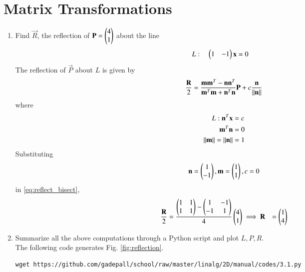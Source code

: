 \documentclass[journal,12pt,twocolumn]{IEEEtran}
\renewcommand\thesection{\arabic{section}}
\begin{document}
\section{Matrix Transformations}
\begin{enumerate}[label=\thesection.\arabic*
,ref=\thesection.\theenumi]

\item Find $\vec{R}$, the reflection  of $\mathbf{P}=\begin{pmatrix}4 \\ 1\end{pmatrix}$ about the line
\begin{align}
L: \quad \begin{pmatrix}1 & -1\end{pmatrix}\mathbf{x} &= 0
\end{align}
\solution The reflection of $\vec{P}$ about  $L$ is given by
\begin{align}
\label{eq:reflect_bisect}
\frac{\mathbf{R}}{2} = \frac{\mathbf{m}\mathbf{m}^T-\mathbf{n}\mathbf{n}^T}{\mathbf{m}^T\mathbf{m}+\mathbf{n}^T\mathbf{n}}\mathbf{P} + c 
\frac{\mathbf{n}}{\lVert\mathbf{n}\rVert}
\end{align}
%
where 
\begin{align}
L: \mathbf{n}^T\mathbf{x} &= c
\\
\mathbf{m}^T\mathbf{n} &= 0
\\
\lVert\mathbf{m}\rVert=\lVert\mathbf{n}\rVert &= 1
\end{align}
%
Substituting
\begin{align}
\mathbf{n} = \begin{pmatrix}1 \\ -1\end{pmatrix}, \mathbf{m} = \begin{pmatrix}1 \\ 1\end{pmatrix}, c = 0
\end{align}
%
in \eqref{eq:reflect_bisect},
\begin{align}
\frac{\mathbf{R}}{2} &= \frac{\begin{pmatrix}1 & 1 \\ 1 & 1\end{pmatrix}-\begin{pmatrix}1 & -1 \\ -1 & 1\end{pmatrix} }{4}\begin{pmatrix}4 \\ 1\end{pmatrix}
\implies \mathbf{R} &= \begin{pmatrix}1 \\ 4\end{pmatrix}
\end{align}
\item Summarize all the above computations through a Python script and plot $L, P, R$.
\\
\solution The following code generates Fig. \ref{fig:reflection}.
\begin{lstlisting}
wget https://github.com/gadepall/school/raw/master/linalg/2D/manual/codes/3.1.py
\end{lstlisting}
\begin{figure}
\centering

\end{figure}
\end{enumerate}
\end{document}
